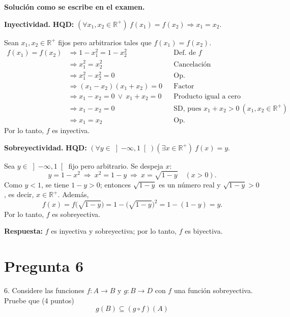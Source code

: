 \documentclass[11pt]{article}
\begin{document}
\textbf{Solución como se escribe en el examen.}

\textbf{Inyectividad.} \textbf{HQD:} $(\forall x_1,x_2\in\mathbb R^+)\ f(x_1)=f(x_2)\Rightarrow x_1=x_2$.

Sean $x_1,x_2\in\mathbb R^+$ fijos pero arbitrarios tales que $f(x_1)=f(x_2)$.
\begin{align*}
f(x_1)=f(x_2)&\Rightarrow 1-x_1^2=1-x_2^2 && \text{Def. de } f\\
&\Rightarrow x_1^2=x_2^2 && \text{Cancelación}\\
&\Rightarrow x_1^2-x_2^2=0 && \text{Op.}\\
&\Rightarrow (x_1-x_2)(x_1+x_2)=0 && \text{Factor}\\
&\Rightarrow x_1-x_2=0\ \vee\ x_1+x_2=0 && \text{Producto igual a cero}\\
&\Rightarrow x_1-x_2=0 && \text{SD, pues } x_1+x_2>0\ (x_1,x_2\in\mathbb R^+)\\
&\Rightarrow x_1=x_2 && \text{Op.}
\end{align*}
Por lo tanto, $f$ es inyectiva.

\textbf{Sobreyectividad.} \textbf{HQD:} $(\forall y\in\left]-\infty,1\right[)(\exists x\in\mathbb R^+)\ f(x)=y$.

Sea $y\in\left]-\infty,1\right[$ fijo pero arbitrario. Se despeja $x$:
\[y=1-x^2\ \Rightarrow\ x^2=1-y\ \Rightarrow\ x=\sqrt{1-y}\quad(x>0).\]
Como $y<1$, se tiene $1-y>0$; entonces $\sqrt{1-y}$ es un número real y $\sqrt{1-y}>0$, es decir, $x\in\mathbb R^+$. Además,
\[f(x)=f\big(\sqrt{1-y}\big)=1-\big(\sqrt{1-y}\big)^2=1-(1-y)=y.\]
Por lo tanto, $f$ es sobreyectiva.

\textbf{Respuesta:} $f$ es inyectiva y sobreyectiva; por lo tanto, $f$ es biyectiva.

\clearpage
\section*{Pregunta 6}

6. Considere las funciones $f:A\to B$ y $g:B\to D$ con \colorbox{green!35}{$f$ una función sobreyectiva}.\\
Pruebe que \hfill (4 puntos)
\[g(B)\subseteq(g\circ f)(A)\]

\begin{center}
\end{center}
\end{document}
